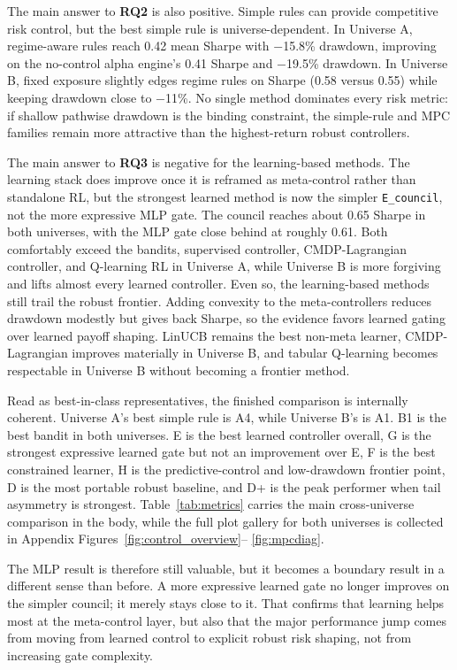 \documentclass[10pt,twocolumn]{article}
\begin{document}
The main answer to \textbf{RQ2} is also positive. Simple rules can provide
competitive risk control, but the best simple rule is universe-dependent. In
Universe A, regime-aware rules reach 0.42 mean Sharpe with $-$15.8\% drawdown,
improving on the no-control alpha engine's 0.41 Sharpe and $-$19.5\% drawdown.
In Universe B, fixed exposure slightly edges regime rules on Sharpe
(0.58 versus 0.55) while keeping drawdown close to $-$11\%. No single method
dominates every risk metric: if shallow pathwise drawdown is the binding
constraint, the simple-rule and MPC families remain more attractive than the
highest-return robust controllers.

The main answer to \textbf{RQ3} is negative for the learning-based methods.
The learning stack does improve once it is reframed as meta-control rather than
standalone RL, but the strongest learned method is now the simpler
\texttt{E\_council}, not the more expressive MLP gate. The council reaches
about 0.65 Sharpe in both universes, with the MLP gate close behind at roughly
0.61. Both comfortably exceed the bandits, supervised controller,
CMDP-Lagrangian controller, and Q-learning RL in Universe A, while Universe B
is more forgiving and lifts almost every learned controller. Even so, the
learning-based methods still trail the robust frontier. Adding convexity to the
meta-controllers reduces drawdown modestly but gives back Sharpe, so the
evidence favors learned gating over learned payoff shaping. LinUCB remains the
best non-meta learner, CMDP-Lagrangian improves materially in Universe B, and
tabular Q-learning becomes respectable in Universe B without becoming a frontier
method.

Read as best-in-class representatives, the finished comparison is internally
coherent. Universe A's best simple rule is A4, while Universe B's is A1. B1 is
the best bandit in both universes. E is the best learned controller overall, G
is the strongest expressive learned gate but not an improvement over E, F is
the best constrained learner, H is the predictive-control and low-drawdown
frontier point, D is the most portable robust baseline, and D+ is the peak
performer when tail asymmetry is strongest. Table~\ref{tab:metrics} carries
the main cross-universe comparison in the body, while the full plot gallery for
both universes is collected in Appendix Figures~\ref{fig:control_overview}--
\ref{fig:mpcdiag}.

The MLP result is therefore still valuable, but it becomes a boundary result in
a different sense than before. A more expressive learned gate no longer
improves on the simpler council; it merely stays close to it. That confirms
that learning helps most at the meta-control layer, but also that the major
performance jump comes from moving from learned control to explicit robust risk
shaping, not from increasing gate complexity.
\end{document}
